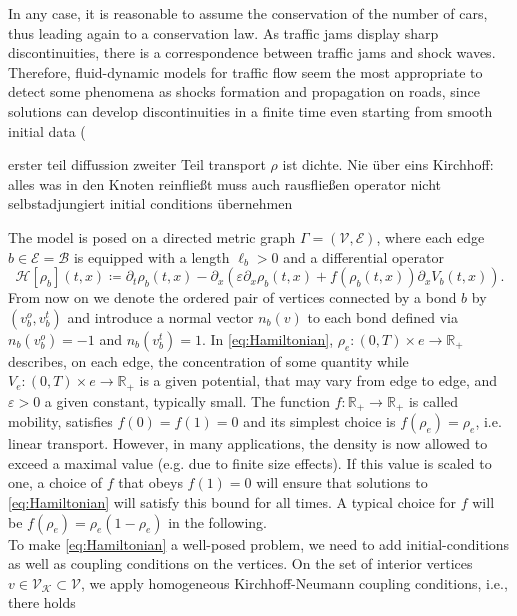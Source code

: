 In any case, it is reasonable to assume the conservation of the number of cars, thus leading again to a conservation law. As traffic jams display sharp discontinuities, there is a correspondence between traffic jams and shock waves. Therefore, fluid-dynamic models for traffic flow seem the most appropriate to detect some phenomena as shocks formation and propagation on roads, since solutions can develop discontinuities in a finite time even starting from smooth initial data (


erster teil diffussion
zweiter Teil transport
$\rho$ ist dichte. Nie über eins
Kirchhoff: alles was in den Knoten reinfließt muss auch rausfließen
operator nicht selbstadjungiert
initial conditions übernehmen

The model is posed on a directed metric graph $\Gamma = (\mathcal{V}, \mathcal{E})$, where each edge $b \in \mathcal{E} = \mathcal{B}$ is equipped with a length $\ell_b > 0$ and a differential operator
\begin{equation} 
    \label{eq:Hamiltonian}
    \mathcal{H} [\rho_b] (t,x) \coloneqq \partial_t \rho_b (t,x)  - \partial_x (\varepsilon \partial_x \rho_b (t,x) + f(\rho_b (t,x) ) \partial_x V_b (t,x)).
\end{equation}
From now on we denote the ordered pair of vertices connected by a bond $b$ by $(v^{o}_b, v^{t}_b)$ and introduce a normal vector $n_b(v)$ to each bond defined via $n_b(v^{o}_b) = -1$ and $n_b(v^{t}_b) = 1$. In \cref{eq:Hamiltonian}, $\rho_e \colon (0,T) \times e \to \mathbb{R}_{+}$ describes, on each edge, the concentration of some quantity while $V_e \colon (0,T) \times e \to \mathbb{R}_{+}$ is a given potential, that may vary from edge to edge, and $\varepsilon > 0$ a given constant, typically small. The function $f \colon \mathbb{R}_{+} \to \mathbb{R}_{+}$ is called mobility, satisfies $f(0) = f(1) = 0$ and its simplest choice is $f(\rho_e) = \rho_e$, i.e. linear transport. However, in many applications, the density is now allowed to exceed a maximal value (e.g. due to finite size effects). If this value is scaled to one, a choice of $f$ that obeys $f(1) = 0$ will ensure that solutions to \eqref{eq:Hamiltonian} will satisfy this bound for all times. A typical choice for $f$ will be $f(\rho_e) = \rho_e(1-\rho_e)$ in the following. \\
To make \cref{eq:Hamiltonian} a well-posed problem, we need to add initial-conditions as well as coupling conditions on the vertices. On the set of interior vertices $v \in \mathcal{V}_\mathcal{K} \subset \mathcal{V}$, we apply homogeneous Kirchhoff-Neumann coupling conditions, i.e., there holds
